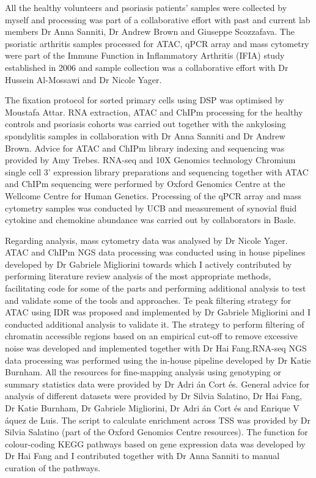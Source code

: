 All the healthy volunteers and psoriasis patients’ samples were collected by myself and processing was part of a collaborative effort with past and current lab members Dr Anna Sanniti, Dr Andrew Brown and Giuseppe Scozzafava. The psoriatic arthritis samples processed for ATAC, qPCR array and mass cytometry were part of the Immune Function in Inflammatory Arthritis (IFIA) study established in 2006 and sample collection was a collaborative effort with Dr Hussein Al-Mossawi and Dr Nicole Yager. 

The fixation protocol for sorted primary cells using DSP was optimised by Moustafa Attar. RNA extraction, ATAC and ChIPm processing for the healthy controls and psoriasis cohorts was carried out together with the ankylosing spondylitis samples in collaboration with Dr Anna Sanniti and Dr Andrew Brown. Advice for ATAC and ChIPm library indexing and sequencing was provided by Amy Trebes. RNA-seq and 10X Genomics technology Chromium single cell 3' expression library preparations and sequencing together with ATAC and ChIPm sequencing were performed by Oxford Genomics Centre at the Wellcome Centre for Human Genetics. Processing of the qPCR array and mass cytometry samples was conducted by UCB and measurement of synovial fluid cytokine and chemokine abundance was carried out by collaborators in Basle.


Regarding analysis, mass cytometry data was analysed by Dr Nicole Yager. ATAC and ChIPm NGS data processing was conducted using in house pipelines developed by Dr Gabriele Migliorini towards which I actively contributed by performing literature review analysis of the most appropriate methods, facilitating code for some of the parts and performing additional analysis to test and validate some of the tools and approaches. Te peak filtering strategy for ATAC using IDR was proposed and implemented by Dr Gabriele Migliorini and I conducted additional analysis to validate it. The strategy to perform filtering of chromatin accessible regions based on an empirical cut-off to remove excessive noise was developed and implemented together with Dr Hai Fang.RNA-seq NGS data processing was performed using the in-house pipeline developed by Dr Katie Burnham. All the resources for fine-mapping analysis using genotyping or summary statistics data were provided by Dr Adri \'{a}n Cort \'{e}s. General advice for analysis of different datasets were provided by Dr Silvia Salatino, Dr Hai Fang, Dr Katie Burnham, Dr Gabriele Migliorini, Dr Adri \'{a}n Cort \'{e}s and Enrique V \'{a}quez de Luis. The script to calculate enrichment across TSS was provided by Dr Silvia Salatino (part of the Oxford Genomics Centre resources). The function for colour-coding KEGG pathways based on gene expression data was developed by Dr Hai Fang and I contributed together with Dr Anna Sanniti to manual curation of the pathways.   


